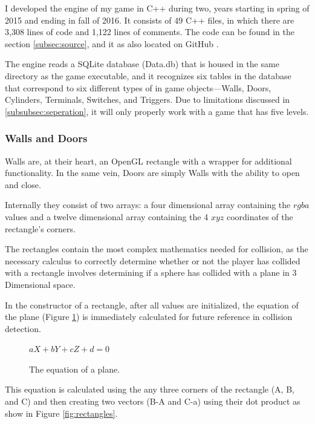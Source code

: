 \documentclass{article}
\begin{document}
I developed the engine of my game in C++ during two, years starting in spring of 2015 and ending in fall of 2016. It consists of 49 C++ files, in which there are 3,308 lines of code and 1,122 lines of comments. The code can be found in the section \ref{subsec:source}, and it as also located on GitHub \cite{bib:git}.

The engine reads a SQLite database (Data.db) that is housed in the same directory as the game executable, and it recognizes six tables in the database that correspond to six different types of in game objects---Walls, Doors, Cylinders, Terminals, Switches, and Triggers. Due to limitations discussed in \ref{subsubsec:seperation}, it will only properly work with a game that has five levels.

\subsubsection{Walls and Doors} \label{subsubsec:walls}

Walls are, at their heart, an OpenGL rectangle with a wrapper for additional functionality. In the same vein, Doors are simply Walls with the ability to open and close.

Internally they consist of two arrays: a four dimensional array containing the $rgba$ values and a twelve dimensional array containing the 4 $xyz$ coordinates of the rectangle's corners. 

The rectangles contain the most complex mathematics needed for collision, as the necessary calculus to correctly determine whether or not the player has collided with a rectangle involves determining if a sphere has collided with a plane in 3 Dimensional space.

In the constructor of a rectangle, after all values are initialized, the equation of the plane (Figure \ref{fig:plane}) is immediately calculated for future reference in collision detection.

\begin{figure}[H]
	\centering
	$aX + bY + cZ + d = 0$
	\caption{The equation of a plane.}
	\label{fig:plane}
\end{figure}

This equation is calculated using the any three corners of the rectangle (A, B, and C) and then creating two vectors (B-A and C-a) using their dot product as show in Figure \ref{fig:rectangles}.
\end{document}
